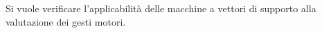 Si vuole verificare l'applicabilit\`a delle macchine a vettori di supporto alla valutazione dei gesti motori.

